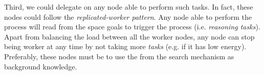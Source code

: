 Third, we could delegate on any node able to perform such tasks.
In fact, these nodes could follow the \emph{replicated-worker pattern}.
Any node able to perform the process will read from the space goals to trigger the process (i.e. \emph{reasoning tasks}).
Apart from balancing the load between all the worker nodes, any node can stop being worker at any time by not taking more \emph{tasks} (e.g. if it has low energy).
Preferably, these nodes must be \consumers{} to use the \clues{} from the search mechanism as background knowledge.






